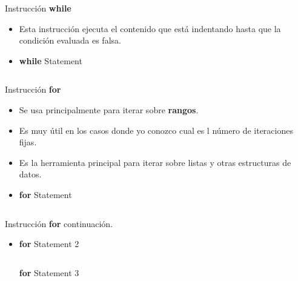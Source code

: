 \documentclass[usenames, dvipsnames, compress]{beamer}
\begin{document}
	\begin{frame}{Instrucción \textbf{while}}
	\begin{itemize}
		\item Esta instrucción ejecuta el contenido que está indentando hasta que la condición evaluada es falsa.
		\pause
		\item [] \begin{block}{\textbf{while} Statement}
			\inputminted[xleftmargin=\parindent,linenos]{python}{codes/while_statement.m}
		\end{block}
	\end{itemize}
	\end{frame}
	\begin{frame}{Instrucción \textbf{for}}
	\begin{itemize}
		\item Se usa principalmente para iterar sobre \textbf{rangos}.
		\pause
		\item Es muy útil en los casos donde yo conozco cual es l número de iteraciones fijas.
		\pause
		\item Es la herramienta principal para iterar sobre listas y otras estructuras de datos.
		\pause
		\item [] \begin{block}{\textbf{for} Statement}
			\inputminted[xleftmargin=\parindent,linenos]{python}{codes/for_statement.m}
		\end{block}
	\end{itemize}
	\end{frame}
	\begin{frame}[allowframebreaks]{Instrucción \textbf{for} continuación.}
	\begin{itemize}
	\item [] \begin{block}{\textbf{for} Statement 2}
		\inputminted[xleftmargin=\parindent,linenos]{python}{codes/for_statement2.m}
	\end{block}
		\begin{block}{\textbf{for} Statement 3}
		\inputminted[xleftmargin=\parindent,linenos]{python}{codes/for_statement3.m}
	\end{block}
	\end{itemize}
	\end{frame}
\end{document}
